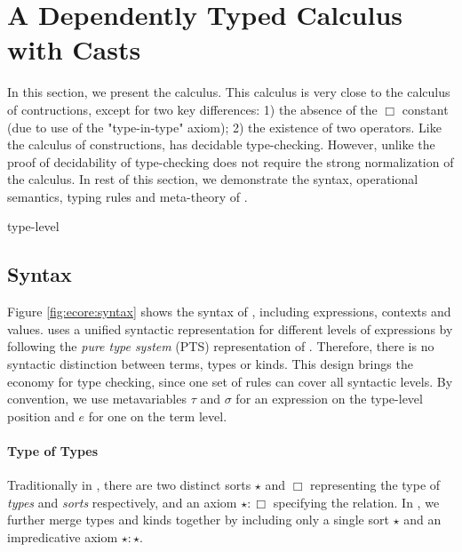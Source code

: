 
\section{A Dependently Typed Calculus with Casts}\label{sec:ecore}

In this section, we present the \ecore calculus. This calculus is very 
close to the calculus of contructions, except for two key differences: 
1) the absence of the $\Box$ constant (due to use of the "type-in-type"
axiom); 2) the existence of two \cast operators. Like the calculus 
of constructions, \ecore has decidable type-checking. However, unlike
\cc the proof of decidability of type-checking does not require 
the strong normalization of the calculus. 
In rest of this
section, we demonstrate the syntax, operational semantics, typing
rules and meta-theory of \ecore.

type-level

\subsection{Syntax}\label{sec:ecore:syn}

Figure \ref{fig:ecore:syntax} shows the syntax of \ecore, including
expressions, contexts and values. \ecore uses a unified syntactic
representation for different levels of expressions by following the
\emph{pure type system} (PTS) representation of \cc. Therefore, there
is no syntactic distinction between terms, types or kinds. This design
brings the economy for type checking, since one set of rules can cover
all syntactic levels. By convention, we use metavariables $\tau$ and
$\sigma$ for an expression on the type-level position and $e$ for one
on the term level.

\paragraph{Type of Types}
Traditionally in \cc, there are two distinct
sorts $\star$ and $\Box$ representing the type of
\emph{types} and \emph{sorts} respectively, and an axiom
$\star:\Box$ specifying the relation. In \ecore, we further
merge types and kinds together by including only a single sort
$\star$ and an impredicative axiom $\star:\star$. 


